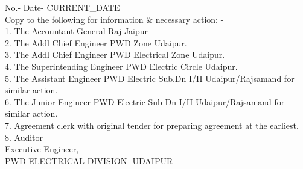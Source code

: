 \documentclass[a4paper]{article}
\begin{document}
No.- \hfill Date- {CURRENT_DATE} \\
Copy to the following for information \& necessary action: - \\
1. The Accountant General Raj Jaipur \\
2. The Addl Chief Engineer PWD Zone Udaipur. \\
3. The Addl Chief Engineer PWD Electrical Zone Udaipur. \\
4. The Superintending Engineer PWD Electric Circle Udaipur. \\
5. The Assistant Engineer PWD Electric Sub.Dn I/II Udaipur/Rajsamand for similar action. \\
6. The Junior Engineer PWD Electric Sub Dn I/II Udaipur/Rajsamand for similar action. \\
7. Agreement clerk with original tender for preparing agreement at the earliest. \\
8. Auditor \\

Executive Engineer, \\
PWD ELECTRICAL DIVISION- UDAIPUR
\end{document}
